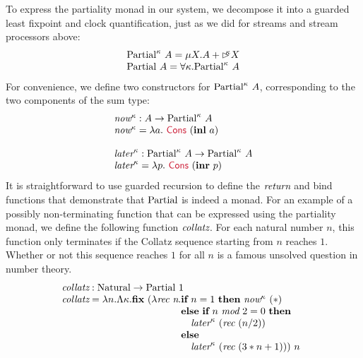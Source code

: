 To express the partiality monad in our system, we decompose it into a
guarded least fixpoint and clock quantification, just as we did for
streams and stream processors above:
\begin{displaymath}
  \begin{array}{l}
    \textrm{Partial}^\kappa~A = \mu X. A + \mathord{\rhd\kern-0.4em^{\kappa}} X \\
    \textrm{Partial}~A = \forall \kappa. \textrm{Partial}^\kappa~A
  \end{array}
\end{displaymath}
For convenience, we define two constructors for
$\textrm{Partial}^\kappa~A$, corresponding to the two components of
the sum type:
\begin{displaymath}
  \begin{array}{l}
    \ident{now}^\kappa : A \to \tyname{Partial}^\kappa~A \\
    \ident{now}^\kappa = \lambda a.~\cons{Cons}~(\kw{inl}~a) \\
    \\
    \ident{later}^\kappa : \tyname{Partial}^\kappa~A \to \tyname{Partial}^\kappa~A \\
    \ident{later}^\kappa = \lambda p.~\cons{Cons}~(\kw{inr}~p)
  \end{array}
\end{displaymath}
It is straightforward to use guarded recursion to define the
$\textit{return}$ and bind functions that demonstrate that
$\textrm{Partial}$ is indeed a monad. For an example of a possibly
non-terminating function that can be expressed using the partiality
monad, we define the following function $\textit{collatz}$. For each
natural number $n$, this function only terminates if the Collatz
sequence starting from $n$ reaches $1$. Whether or not this sequence
reaches $1$ for all $n$ is a famous unsolved question in number
theory.
\begin{displaymath}
  \begin{array}{l}
    \ident{collatz} : \tyname{Natural} \to \tyname{Partial}~1 \\
    \ident{collatz} = \lambda n. \Lambda \kappa. \kw{fix}~(\lambda \ident{rec}~\ident{n}.
    \begin{array}[t]{@{}l}
      \kw{if}~n = 1~\kw{then}~\ident{now}^\kappa~(*) \\
      \kw{else}~\kw{if}~n~\ident{mod}~2 = 0~\kw{then} \\
      \quad \ident{later}^\kappa~(\ident{rec}~(n/2)) \\
      \kw{else} \\
      \quad \ident{later}^\kappa~(\ident{rec}~(3*n + 1)))~n
    \end{array}
  \end{array}
\end{displaymath}

